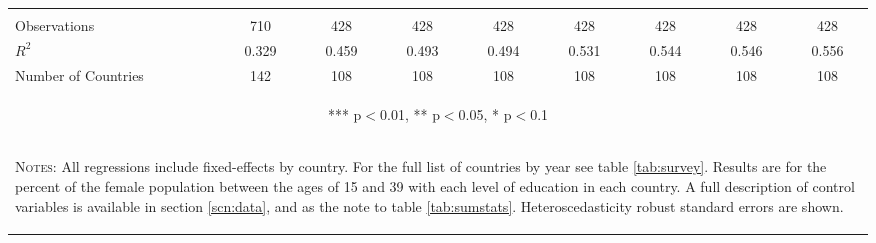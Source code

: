 \begin{landscape}
\begin{table}[htpb!]
\begin{center}
\begin{tabular}{lcccccccc}
\vspace{4pt} & \begin{footnotesize}\end{footnotesize} & \begin{footnotesize}\end{footnotesize} & \begin{footnotesize}\end{footnotesize} & \begin{footnotesize}\end{footnotesize} & \begin{footnotesize}\end{footnotesize} & \begin{footnotesize}\end{footnotesize} & \begin{footnotesize}\end{footnotesize} & \begin{footnotesize}\end{footnotesize} \\																		
Observations	&	710	&	428	&	428	&	428	&	428	&	428	&	428	&	428	\\	
$R^2$	&	0.329	&	0.459	&	0.493	&	0.494	&	0.531	&	0.544	&	0.546	&	0.556	\\	
Number of Countries	&	142	&	108	&	108	&	108	&	108	&	108	&	108	&	108	\\	\midrule
\multicolumn{9}{c}{\begin{footnotesize} *** p$<$0.01, ** p$<$0.05, * p$<$0.1\end{footnotesize}} \\																		
\multicolumn{9}{p{20cm}}{\begin{footnotesize}\textsc{Notes:} All regressions include fixed-effects by country.  For the full list of countries by year see table \ref{tab:survey}.  Results are for the percent of the female population between the ages of 15 and 39 with each level of education in each country.  A full description of control variables is available in section \ref{scn:data}, and as the note to table \ref{tab:sumstats}.  Heteroscedasticity robust standard errors are shown. \end{footnotesize}} \\																
\bottomrule																		
\end{tabular}											
\end{center}											
\end{table}											
\end{landscape}

